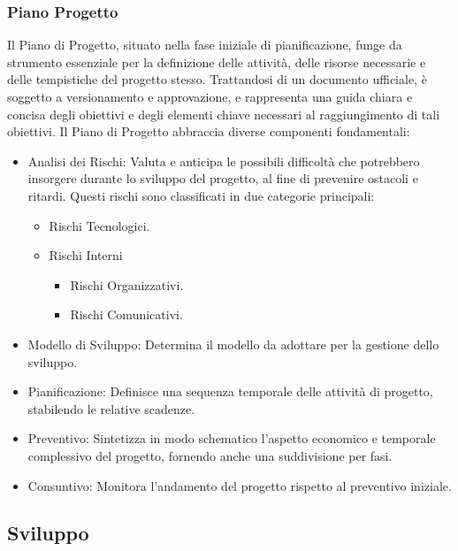 \documentclass{article}
\begin{document}
\subsubsection{Piano Progetto}
Il Piano di Progetto, situato nella fase iniziale di pianificazione, funge da strumento essenziale per la definizione delle attività, delle risorse necessarie e delle tempistiche del progetto stesso. Trattandosi di un documento ufficiale, è soggetto a versionamento e approvazione, e rappresenta una guida chiara e concisa degli obiettivi e degli elementi chiave necessari al raggiungimento di tali obiettivi.
Il Piano di Progetto abbraccia diverse componenti fondamentali:
\begin{itemize}
    \item Analisi dei Rischi: Valuta e anticipa le possibili difficoltà che potrebbero insorgere durante lo sviluppo del progetto, al fine di prevenire ostacoli e ritardi. Questi rischi sono classificati in due categorie principali:
    \begin{itemize}
        \item Rischi Tecnologici.
        \item Rischi Interni
        \begin{itemize}
            \item Rischi Organizzativi.
            \item Rischi Comunicativi.
        \end{itemize}
    \end{itemize}
    \item Modello di Sviluppo: Determina il modello da adottare per la gestione dello sviluppo.
    \item Pianificazione: Definisce una sequenza temporale delle attività di progetto, stabilendo le relative scadenze.
    \item Preventivo: Sintetizza in modo schematico l'aspetto economico e temporale complessivo del progetto, fornendo anche una suddivisione per fasi.
    \item Consuntivo: Monitora l'andamento del progetto rispetto al preventivo iniziale.
\end{itemize}


\subsection{Sviluppo}
\end{document}

